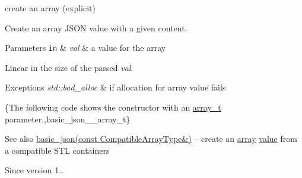 create an array (explicit) 

Create an array J\+S\+ON value with a given content.


\begin{DoxyParams}[1]{Parameters}
\mbox{\tt in}  & {\em val} & a value for the array\\
\hline
\end{DoxyParams}
Linear in the size of the passed {\itshape val}.


\begin{DoxyExceptions}{Exceptions}
{\em std\+::bad\+\_\+alloc} & if allocation for array value fails\\
\hline
\end{DoxyExceptions}
\{The following code shows the constructor with an \hyperlink{a00025_ab00b882d39306d663c23dab110f5cae0}{array\+\_\+t} parameter.,basic\+\_\+json\+\_\+\+\_\+array\+\_\+t\}

\begin{DoxySeeAlso}{See also}
\hyperlink{a00025_a81aaaab0f3b326afda2d226daab4f1e1}{basic\+\_\+json(const Compatible\+Array\+Type\&)} -- create an \hyperlink{a00025_a5685815624b086caa532f41e853d4b0f}{array} \hyperlink{a00025_a0a2cbbd95862a623e7dc5c37e67dead0}{value} from a compatible S\+TL containers
\end{DoxySeeAlso}
\begin{DoxySince}{Since}
version 1.. 
\end{DoxySince}
